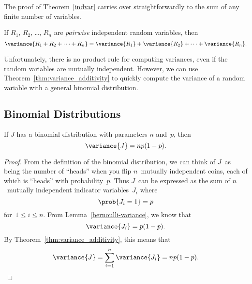 The proof of Theorem~\ref{indvar} carries over straightforwardly to
the sum of any finite number of variables.

\begin{theorem}
\label{thm:variance_additivity}
If $R_1$, $R_2$, \dots, $R_n$ are \emph{pairwise} independent random
variables, then
\begin{equation}\label{vsum}
\variance{R_1 + R_2 + \cdots + R_n} = \variance{R_1} + \variance{R_2} +
  \cdots + \variance{R_n}.
\end{equation}
\end{theorem}

Unfortunately, there is no product rule for computing variances, even
if the random variables are mutually independent.  However, we can use
Theorem~\ref{thm:variance_additivity} to quickly compute the variance
of a random variable with a general binomial distribution.

\subsection{Binomial Distributions}

\begin{lemma}
\label{lem:binomial_variance}
If $J$ has a binomial distribution with parameters $n$ and~$p$, then
\begin{equation}\label{p1p}
\variance{J} = n p (1-p).
\end{equation}
\end{lemma}

\begin{proof}

From the definition of the binomial distribution, we can think of
$J$~as being the number of ``heads'' when you flip $n$~mutually
independent coins, each of which is ``heads'' with probability~$p$.
Thus $J$~can be expressed as the sum of $n$~mutually independent
indicator variables~$J_i$ where
\begin{equation*}
    \prob{J_i = 1} = p
\end{equation*}
for~$1 \le i \le n$.  From Lemma~\ref{bernoulli-variance}, we know
that
\begin{equation*}
    \variance{J_i} = p (1 - p).
\end{equation*}
By Theorem~\ref{thm:variance_additivity}, this means that
\begin{equation*}
\variance{J}
    = \sum_{i = 1}^n \variance{J_i}
    = n p (1 - p). \qedhere
\end{equation*}
\end{proof}

